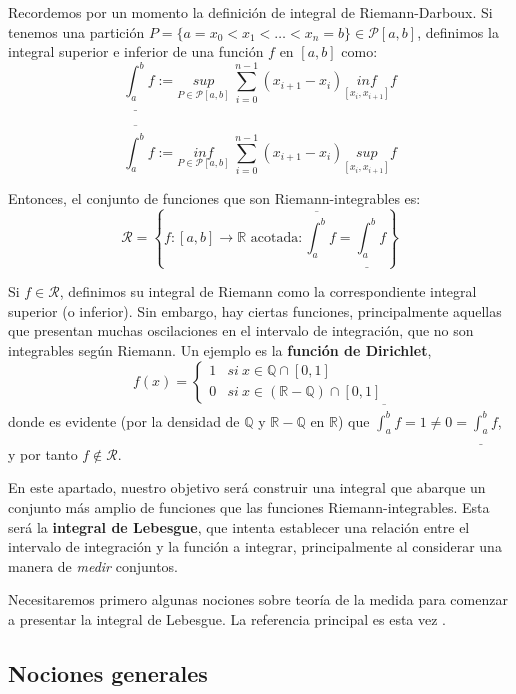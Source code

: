 \documentclass[11pt, a4paper]{article}
\theoremstyle{theorem-style}
\theoremstyle{definition-style}
\theoremstyle{remark-style}
\theoremstyle{example-style}
\begin{document}
Recordemos por un momento la definición de integral de Riemann-Darboux. Si tenemos una partición $P = \{ a = x_0 < x_1 < \dots < x_n = b\} \in \mathcal P [a,b]$, definimos la integral superior e inferior de una función $f$ en $[a,b]$ como: $$\underline{\int_a^b} f := \underset{P \in \mathcal P [a,b]}{sup} \ \sum_{i=0}^{n-1} (x_{i+1} - x_i) \underset{[x_i, x_{i+1}]}{inf} f$$

$$\overline {\int_a^b} f := \underset{P \in \mathcal P [a,b]}{inf} \ \sum_{i=0}^{n-1} (x_{i+1} - x_i) \underset{[x_i, x_{i+1}]}{sup} f$$

Entonces, el conjunto de funciones que son Riemann-integrables es: $$\mathcal R = \left\{ f:[a,b] \to \mathbb{R} \text{ acotada} : \overline {\int_a^b} f = \underline {\int_a^b} f\right\}$$

Si $f \in \mathcal R$, definimos su integral de Riemann como la correspondiente integral superior (o inferior). Sin embargo, hay ciertas funciones, principalmente aquellas que presentan muchas oscilaciones en el intervalo de integración, que no son integrables según Riemann. Un ejemplo es la \textbf{función de Dirichlet}, $$f(x) = \begin{cases} 1 & si \ x \in \mathbb Q \cap [0,1]\\ 0 & si \ x \in (\mathbb{R} - \mathbb Q) \cap [0,1] \end{cases}$$ donde es evidente (por la densidad de $\mathbb Q$ y $\mathbb{R} - \mathbb Q$ en $\mathbb{R}$) que $\displaystyle \overline {\int_a^b} f = 1 \ne 0 = \underline {\int_a^b} f$, y por tanto $f \notin \mathcal R$.

En este apartado, nuestro objetivo será construir una integral que abarque un conjunto más amplio de funciones que las funciones Riemann-integrables. Esta será la \textbf{integral de Lebesgue}, que intenta establecer una relación entre el intervalo de integración y la función a integrar, principalmente al considerar una manera de \textit{medir} conjuntos.

Necesitaremos primero algunas nociones sobre teoría de la medida para comenzar a presentar la integral de Lebesgue. La referencia principal es esta vez \cite[Chapter 1]{rudin}.



\subsection{Nociones generales}
\end{document}
